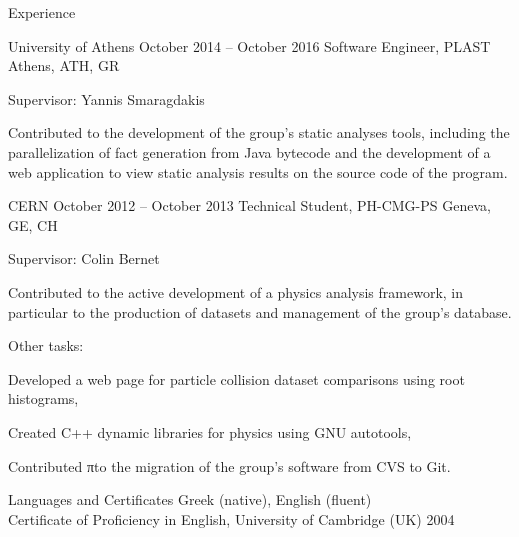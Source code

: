 \documentclass{resume}
\begin{document}
\begin{rSection}{Experience}

\begin{rSubsection}
  {University of Athens}
  {October 2014 -- October 2016}
  {Software Engineer, PLAST}
  {Athens, ATH, GR}
\item Supervisor: Yannis Smaragdakis
\item Contributed to the development of the group's static analyses tools, including the
  parallelization of fact generation from Java bytecode and the development
  of a web application to view static analysis results on the source code of the program.
\end{rSubsection}


\begin{rSubsection}
  {CERN}
  {October 2012 -- October 2013}
  {Technical Student, PH-CMG-PS}
  {Geneva, GE, CH}
\item Supervisor: Colin Bernet
  \item Contributed to the active development of a physics analysis framework,
  in particular to the production of datasets and management of the
  group's database.
\item Other tasks: \\
  \begin{inparaenum}[(i)]
  \item Developed a web page for particle collision dataset comparisons using root histograms, \\
  \item Created C++ dynamic libraries for physics using GNU autotools, \\
  \item Contributed πto the migration of the group's software from CVS to Git.
  \end{inparaenum}
\end{rSubsection}

\end{rSection}

\pagebreak

\begin{rSection}{Languages and Certificates}
  Greek (native), English (fluent) \\
  Certificate of Proficiency in English, University of Cambridge (UK)
  \hfill 2004
\end{rSection}


\end{document}
